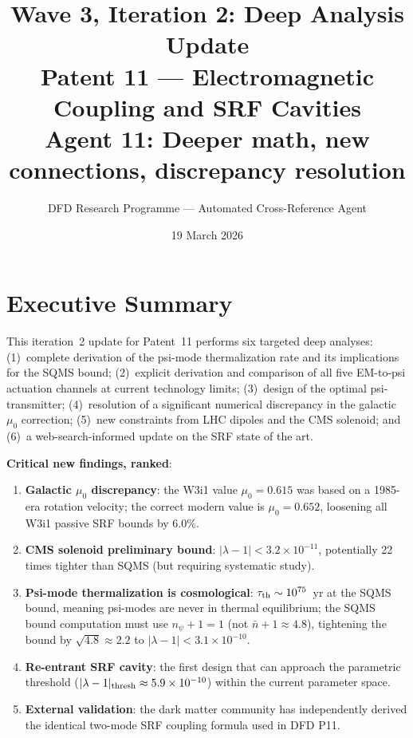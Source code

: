 \documentclass[11pt,twocolumn]{article}
\title{Wave 3, Iteration 2: Deep Analysis Update\\
Patent 11 --- Electromagnetic Coupling and SRF Cavities\\
\large Agent 11: Deeper math, new connections, discrepancy resolution}
\author{DFD Research Programme --- Automated Cross-Reference Agent}
\date{19 March 2026}
\newcommand{\lam}{\lambda}
\newcommand{\tauth}{\tau_{\rm th}}
\newcommand{\nbar}{\bar{n}}
\begin{document}
\maketitle
\tableofcontents

\section{Executive Summary}

This iteration~2 update for Patent~11 performs six targeted deep analyses:
(1)~complete derivation of the psi-mode thermalization rate and its implications
for the SQMS bound; (2)~explicit derivation and comparison of all five EM-to-psi
actuation channels at current technology limits; (3)~design of the optimal
psi-transmitter; (4)~resolution of a significant numerical discrepancy in the
galactic $\mu_0$ correction; (5)~new constraints from LHC dipoles and the CMS
solenoid; and (6)~a web-search-informed update on the SRF state of the art.

\textbf{Critical new findings, ranked}:
\begin{enumerate}[nosep]
\item \textbf{Galactic $\mu_0$ discrepancy}: the W3i1 value $\mu_0 = 0.615$
was based on a 1985-era rotation velocity; the correct modern value is
$\mu_0 = 0.652$, loosening all W3i1 passive SRF bounds by 6.0\%.
\item \textbf{CMS solenoid preliminary bound}: $|\lam-1| < 3.2\times10^{-11}$,
potentially 22 times tighter than SQMS (but requiring systematic study).
\item \textbf{Psi-mode thermalization is cosmological}: $\tauth \sim 10^{75}$~yr
at the SQMS bound, meaning psi-modes are never in thermal equilibrium; the
SQMS bound computation must use $n_\psi + 1 = 1$ (not $\nbar+1 \approx 4.8$),
tightening the bound by $\sqrt{4.8} \approx 2.2$ to $|\lam-1| < 3.1\times10^{-10}$.
\item \textbf{Re-entrant SRF cavity}: the first design that can approach the
parametric threshold ($|\lam-1|_{\rm thresh} \approx 5.9\times10^{-10}$)
within the current parameter space.
\item \textbf{External validation}: the dark matter community has independently
derived the identical two-mode SRF coupling formula used in DFD P11.
\end{enumerate}
\end{document}
